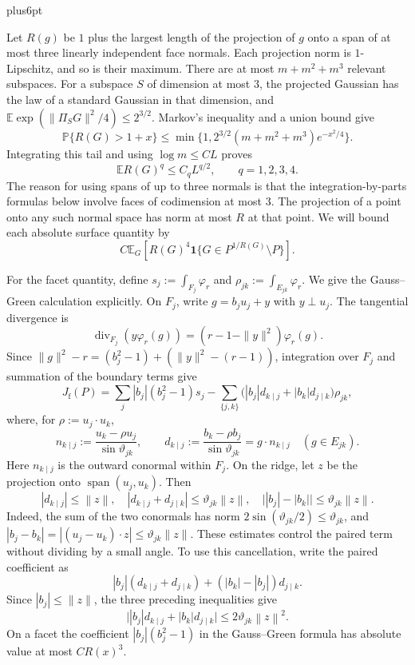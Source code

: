 \documentclass[11pt,letterpaper,twoside,leqno]{article}
\makeatletter
\theoremstyle{bookplain}
\theoremstyle{bookremark}
\renewenvironment{proof}[1][\proofname]{\par
  \pushQED{\qed}\normalfont\topsep6pt plus6pt\relax
  \trivlist\item[\hskip\labelsep\bfseries #1\@addpunct{.}]\ignorespaces
}{\popQED\endtrivlist\@endpefalse}
\newcommand{\E}{\mathbb E}
\newcommand{\Pp}{\mathbb P}
\newcommand{\norm}[1]{\left\lVert#1\right\rVert}
\newcommand{\ind}{\mathbf 1}
\makeatother
\begin{document}
\begin{proof}
Let $R(g)$ be $1$ plus the largest length of the projection of $g$
onto a span of at most three linearly independent face normals.
Each projection norm is $1$-Lipschitz, and so is their maximum.
There are at most $m+m^2+m^3$ relevant subspaces. For a subspace $S$
of dimension at most $3$, the projected Gaussian has the law of a
standard Gaussian in that dimension, and
$\E\exp(\|\Pi_SG\|^2/4)\le2^{3/2}$.
Markov's inequality and a union bound give
\[
 \Pp\{R(G)>1+x\}\le
       \min\{1,2^{3/2}(m+m^2+m^3)e^{-x^2/4}\}.
\]
Integrating this tail and using $\log m\le CL$ proves
\begin{equation}
 \E R(G)^q\le C_qL^{q/2},\qquad q=1,2,3,4.
 \label{hgap:eq:R-moments}
\end{equation}
The reason for using spans of up to three normals is that the
integration-by-parts formulas below involve faces of codimension at
most $3$. The projection of a point onto any such normal space has
norm at most $R$ at that point. We will bound each absolute surface
quantity by
\begin{equation}
 C\E_G\left[R(G)^4
       \ind\{G\in P^{1/R(G)}\setminus P\}\right].
 \label{hgap:eq:localized}
\end{equation}

For the facet quantity, define $s_j:=\int_{F_j}\varphi_r$ and
$\rho_{jk}:=\int_{E_{jk}}\varphi_r$.
We give the Gauss--Green calculation explicitly. On $F_j$, write
$g=b_ju_j+y$ with $y\perp u_j$. The tangential divergence is
\[
 \operatorname{div}_{F_j}(y\varphi_r(g))
       =(r-1-\|y\|^2)\varphi_r(g).
\]
Since $\|g\|^2-r=(b_j^2-1)+(\|y\|^2-(r-1))$, integration over
$F_j$ and summation of the boundary terms give
\[
 J_{\mathrm f}(P)
 =\sum_j |b_j|(b_j^2-1)s_j
 -\sum_{\{j,k\}}
   \bigl(|b_j|d_{k\mid j}+|b_k|d_{j\mid k}\bigr)\rho_{jk},
\]
where, for $\rho:=u_j\cdot u_k$,
\[
 n_{k\mid j}:=\frac{u_k-\rho u_j}{\sin\vartheta_{jk}},\qquad
 d_{k\mid j}:=\frac{b_k-\rho b_j}{\sin\vartheta_{jk}}
             =g\cdot n_{k\mid j}\quad(g\in E_{jk}).
\]
Here $n_{k\mid j}$ is the outward conormal within $F_j$.
On the ridge, let $z$ be the projection onto
$\operatorname{span}(u_j,u_k)$. Then
\[
 |d_{k\mid j}|\le\norm z,\quad
 |d_{k\mid j}+d_{j\mid k}|\le\vartheta_{jk}\norm z,\quad
 \bigl||b_j|-|b_k|\bigr|\le\vartheta_{jk}\norm z.
\]
Indeed, the sum of the two conormals has norm
$2\sin(\vartheta_{jk}/2)\le\vartheta_{jk}$, and
$|b_j-b_k|=|(u_j-u_k)\cdot z|\le\vartheta_{jk}\|z\|$.
These estimates control the paired term without dividing by a small
angle.
To use this cancellation, write the paired coefficient as
\[
 |b_j|(d_{k\mid j}+d_{j\mid k})
                  +( |b_k|-|b_j| )d_{j\mid k}.
\]
Since $|b_j|\le\|z\|$, the three preceding inequalities give
\begin{equation}
 \bigl||b_j|d_{k\mid j}+|b_k|d_{j\mid k}\bigr|
 \le 2\vartheta_{jk}\norm z^2.
 \label{hgap:eq:weighted-pair}
\end{equation}
On a facet the coefficient $|b_j|(b_j^2-1)$ in the
Gauss--Green formula has absolute value at most $CR(x)^3$.


\end{proof}
\end{document}
